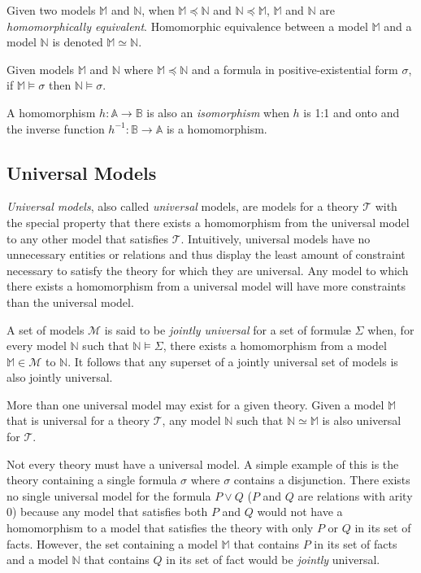 		Given two models $\mathbb{M}$ and $\mathbb{N}$, when $\mathbb{M}
		\preceq \mathbb{N}$ and $\mathbb{N} \preceq \mathbb{M}$, $\mathbb{M}$
		and $\mathbb{N}$ are \emph{homomorphically equivalent}. Homomorphic
		equivalence between a model $\mathbb{M}$ and a model $\mathbb{N}$ is
		denoted $\mathbb{M} \simeq \mathbb{N}$.

		Given models $\mathbb{M}$ and $\mathbb{N}$ where $\mathbb{M} \preceq
		\mathbb{N}$ and a formula in positive-existential form $\sigma$, if
		$\mathbb{M} \models \sigma$ then $\mathbb{N} \models \sigma$.

		A homomorphism $h : \mathbb{A} \to \mathbb{B}$ is also an
		\emph{isomorphism} when $h$ is 1:1 and onto and the inverse function
		$h^{-1} : \mathbb{B} \to \mathbb{A}$ is a homomorphism.

	\subsection{Universal Models}
	\label{sec:technical_background.universal_models}

		\emph{Universal models}, also called \emph{universal} models, are models
		for a theory $\mathcal{T}$ with the special property that there exists a
		homomorphism from the universal model to any other model that satisfies
		$\mathcal{T}$. Intuitively, universal models have no unnecessary entities or
		relations and thus display the least amount of constraint necessary to
		satisfy the theory for which they are universal. Any model to which there
		exists a homomorphism from a universal model will have more constraints
		than the universal model.

		A set of models $\mathcal{M}$ is said to be \emph{jointly universal} for
		a set of formul{\ae} $\Sigma$ when, for every model $\mathbb{N}$ such
		that $\mathbb{N} \models \Sigma$, there exists a homomorphism from a
		model $\mathbb{M} \in \mathcal{M}$ to $\mathbb{N}$. It follows that any
		superset of a jointly universal set of models is also jointly universal.

		More than one universal model may exist for a given theory. Given a model
		$\mathbb{M}$ that is universal for a theory $\mathcal{T}$, any model $\mathbb{N}$
		such that $\mathbb{N} \simeq \mathbb{M}$ is also universal for $\mathcal{T}$.

		Not every theory must have a universal model. A simple example of this is
		the theory containing a single formula $\sigma$ where $\sigma$ contains
		a disjunction. There exists no single universal model for the formula $P
		\vee Q$ ($P$ and $Q$ are relations with arity $0$) because any model that
		satisfies both $P$ and $Q$ would not have a homomorphism to a model
		that satisfies the theory with only $P$ or $Q$ in its set of facts.
		However, the set containing a model $\mathbb{M}$ that contains $P$ in
		its set of facts and a model $\mathbb{N}$ that contains $Q$ in its
		set of fact would be \emph{jointly} universal.

